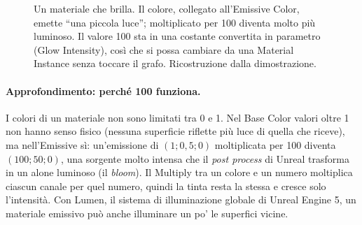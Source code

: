 \begin{figure}[htbp]
\centering
{}
\caption{Un materiale che brilla. Il colore, collegato all'Emissive Color, emette ``una
piccola luce''; moltiplicato per 100 diventa molto più luminoso. Il valore 100 sta in
una costante convertita in parametro (Glow Intensity), così che si possa cambiare da
una Material Instance senza toccare il grafo. Ricostruzione dalla dimostrazione.}
\label{ue3:fig:emissive}
\end{figure}

\paragraph{Approfondimento: perché 100 funziona.} I colori di un materiale non sono
limitati tra 0 e 1. Nel Base Color valori oltre 1 non hanno senso fisico (nessuna
superficie riflette più luce di quella che riceve), ma nell'Emissive sì: un'emissione di
$(1; 0{,}5; 0)$ moltiplicata per 100 diventa $(100; 50; 0)$, una sorgente molto intensa
che il \emph{post process} di Unreal trasforma in un alone luminoso (il \emph{bloom}).
Il Multiply tra un colore e un numero moltiplica ciascun canale per quel numero, quindi
la tinta resta la stessa e cresce solo l'intensità. Con Lumen, il sistema di
illuminazione globale di Unreal Engine 5, un materiale emissivo può anche illuminare un
po' le superfici vicine.

